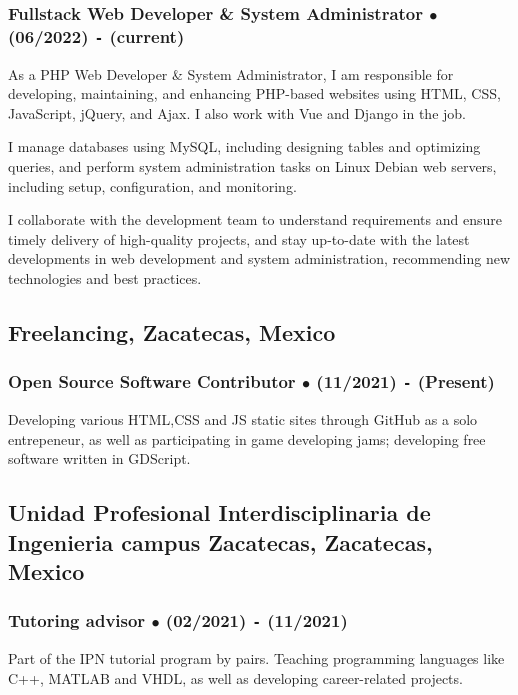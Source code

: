 \documentclass{article}
\begin{document}
  \subsubsection{Fullstack Web Developer \& System Administrator $\bullet$ (06/2022) \texttt{-} (current)}

  As a PHP Web Developer \& System Administrator, I am responsible for developing, maintaining, and enhancing PHP-based websites using HTML, CSS, JavaScript, jQuery, and Ajax. I also work with Vue and Django in the job. \newline

 I manage databases using MySQL, including designing tables and optimizing queries, and perform system administration tasks on Linux Debian web servers, including setup, configuration, and monitoring. \newline
 
I collaborate with the development team to understand requirements and ensure timely delivery of high-quality projects, and stay up-to-date with the latest developments in web development and system administration, recommending new technologies and best practices.

  \subsection{\textbf{Freelancing}, Zacatecas, Mexico}

  \subsubsection{Open Source Software Contributor $\bullet$ (11/2021) \texttt{-} (Present)}

  Developing various HTML,CSS and JS static sites through GitHub as a solo entrepeneur, as well as participating in game developing jams; developing free software written in GDScript.

  \subsection{Unidad Profesional Interdisciplinaria de Ingenieria campus Zacatecas, Zacatecas, Mexico}

  \subsubsection{Tutoring advisor $\bullet$ (02/2021) \texttt{-} (11/2021)}

  Part of the IPN tutorial program by pairs. Teaching programming languages like C++, MATLAB and VHDL, as well as developing career-related projects.%
\end{document}
